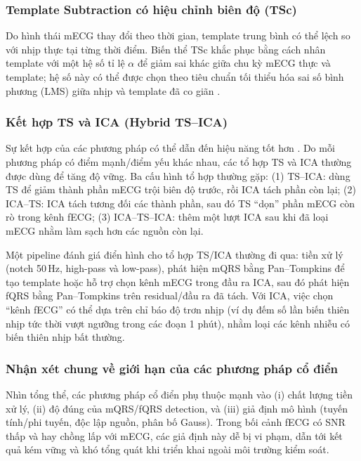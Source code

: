 \documentclass[../DoAn.tex]{subfiles}
\begin{document}
\subsubsection{Template Subtraction có hiệu chỉnh biên độ (TSc)}
Do hình thái mECG thay đổi theo thời gian, template trung bình có thể lệch so với nhịp thực tại từng thời điểm. Biến thể TSc khắc phục bằng cách nhân template với một hệ số tỉ lệ $\alpha$ để giảm sai khác giữa chu kỳ mECG thực và template; hệ số này có thể được chọn theo tiêu chuẩn tối thiểu hóa sai số bình phương (LMS) giữa nhịp và template đã co giãn \cite{martensRobustFetalECG2007}.

\subsubsection{Kết hợp TS và ICA (Hybrid TS--ICA)}
Sự kết hợp của các phương pháp có thể dẫn đến hiệu năng tốt hơn \cite{beharNoninvasiveFECGExtraction2013}. Do mỗi phương pháp có điểm mạnh/điểm yếu khác nhau, các tổ hợp TS và ICA thường được dùng để tăng độ vững. Ba cấu hình tổ hợp thường gặp:
(1) TS--ICA: dùng TS để giảm thành phần mECG trội biên độ trước, rồi ICA tách phần còn lại;
(2) ICA--TS: ICA tách tương đối các thành phần, sau đó TS “dọn” phần mECG còn rò trong kênh fECG;
(3) ICA--TS--ICA: thêm một lượt ICA sau khi đã loại mECG nhằm làm sạch hơn các nguồn còn lại.

Một pipeline đánh giá điển hình cho tổ hợp TS/ICA thường đi qua: tiền xử lý (notch 50\,Hz, high-pass và low-pass), phát hiện mQRS bằng Pan--Tompkins để tạo template hoặc hỗ trợ chọn kênh mECG trong đầu ra ICA, sau đó phát hiện fQRS bằng Pan--Tompkins trên residual/đầu ra đã tách. Với ICA, việc chọn “kênh fECG” có thể dựa trên chỉ báo độ trơn nhịp (ví dụ đếm số lần biến thiên nhịp tức thời vượt ngưỡng trong các đoạn 1 phút), nhằm loại các kênh nhiễu có biến thiên nhịp bất thường.

\subsubsection{Nhận xét chung về giới hạn của các phương pháp cổ điển}
Nhìn tổng thể, các phương pháp cổ điển phụ thuộc mạnh vào (i) chất lượng tiền xử lý, (ii) độ đúng của mQRS/fQRS detection, và (iii) giả định mô hình (tuyến tính/phi tuyến, độc lập nguồn, phân bố Gauss). Trong bối cảnh fECG có SNR thấp và hay chồng lấp với mECG, các giả định này dễ bị vi phạm, dẫn tới kết quả kém vững và khó tổng quát khi triển khai ngoài môi trường kiểm soát.
\end{document}
